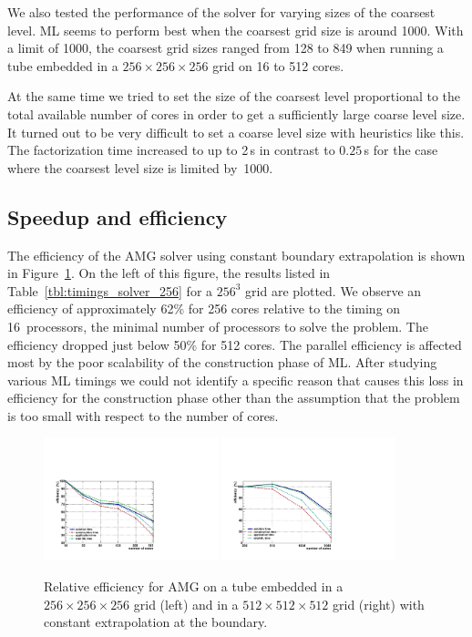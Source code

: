 We also tested the performance of the solver for varying sizes of the
coarsest level.  ML seems to perform best when the coarsest grid size is
around 1000.  With a limit of 1000, the coarsest grid sizes ranged from
128 to 849 when running a tube embedded in a $256 \times 256 \times 256$
grid on 16 to 512 cores.

At the same time we tried to set the size of the coarsest level
proportional to the total available number of cores in order to get a
sufficiently large coarse level size.  It turned out to be very difficult
to set a coarse level size with heuristics like this.  The factorization
time increased to up to 2\,s in contrast to $0.25$\,s for the case where
the coarsest level size is limited by~1000.


\subsection{Speedup and efficiency}

The efficiency of the AMG solver using constant boundary extrapolation
is shown in Figure~\ref{fig:speedup}.  On the left of this figure, the
results listed in Table~\ref{tbl:timings_solver_256} for a $256^3$ grid
are plotted.  We observe an efficiency of approximately 62\% for 256
cores relative to the timing on 16~processors, the minimal number of
processors to solve the problem.  The efficiency dropped just below 50\%
for 512 cores.  The parallel efficiency is affected most by the poor
scalability of the construction phase of ML.  After studying various ML
timings we could not identify a specific reason that causes this loss in
efficiency for the construction phase other than the assumption that the
problem is too small with respect to the number of cores.

\begin{figure}[htb] 
  \begin{center}
    \includegraphics[width=0.45\textwidth]{figures/eff_256.pdf}
    \includegraphics[width=0.45\textwidth]{figures/eff_512.pdf}
    \caption{Relative efficiency for AMG on a tube embedded in a
      $256\times256\times256$ grid (left) and in a
      $512\times512\times512$ grid (right) with constant extrapolation
      at the boundary.}
    \label{fig:speedup}
  \end{center} 
\end{figure}

